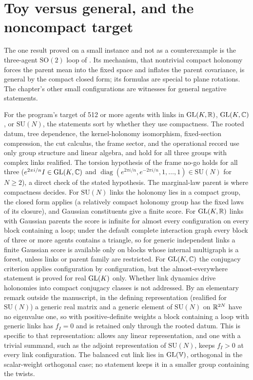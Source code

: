 \section{Toy versus general, and the noncompact target}
\label{comp:ch10-toy}

The one result proved on a small instance and not as a counterexample is the three-agent
$\mathrm{SO}(2)$ loop of . Its mechanism, that nontrivial compact holonomy
forces the parent mean into the fixed space and inflates the parent covariance, is general by the compact
closed form; its formulas are special to plane rotations. The chapter's other small configurations are
witnesses for general negative statements.

For the program's target of 512 or more agents with links in $\mathrm{GL}(K,\mathbb R)$, $\mathrm{GL}(K,\mathbb C)$, or
$\mathrm{SU}(N)$, the statements sort by whether they use compactness. The rooted datum, tree dependence,
the kernel-holonomy isomorphism, fixed-section compression, the cut calculus, the frame sector, and the
operational record use only group structure and linear algebra, and hold for all three groups with
complex links realified. The torsion hypothesis of the frame no-go holds for all three
($e^{2\pi i/n}I\in\mathrm{GL}(K,\mathbb C)$ and $\operatorname{diag}(e^{2\pi i/n},e^{-2\pi i/n},1,\ldots,1)\in
\mathrm{SU}(N)$ for $N\geq2$), a direct check of the stated hypothesis. The marginal-law parent is where
compactness decides. For $\mathrm{SU}(N)$ links the holonomy lies in a compact group, the closed form
applies (a relatively compact holonomy group has the fixed laws of its closure), and Gaussian
constituents give a finite score. For $\mathrm{GL}(K,\mathbb R)$ links with Gaussian parents the score is infinite for
almost every configuration on every block containing a loop; under the default complete interaction
graph every block of three or more agents contains a triangle, so for generic independent links a finite
Gaussian score is available only on blocks whose internal multigraph is a forest, unless links or parent
family are restricted. For $\mathrm{GL}(K,\mathbb C)$ the conjugacy criterion applies configuration by
configuration, but the almost-everywhere statement is proved for real $\mathrm{GL}(K)$ only. Whether link
dynamics drive holonomies into compact conjugacy classes is not addressed. By an elementary remark
outside the manuscript, in the defining representation (realified for $\mathrm{SU}(N)$) a generic real
matrix and a generic element of $\mathrm{SU}(N)$ on $\mathbb R^{2N}$ have no eigenvalue one, so with
positive-definite weights a block containing a loop with generic links has $f_I=0$ and is retained only
through the rooted datum. This is specific to that representation: 
allows any linear representation, and one with a trivial summand, such as the adjoint representation of
$\mathrm{SU}(N)$, keeps $f_I>0$ at every link configuration. The balanced cut link lies in $\mathrm{GL}(\mathbb V)$,
orthogonal in the scalar-weight orthogonal case; no statement keeps it in a smaller group containing the
twists.

